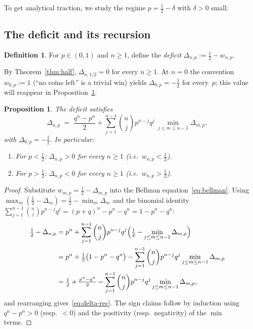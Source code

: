 \documentclass[reqno,final,11pt]{amsart}
\theoremstyle{plain}
\newtheorem{proposition}[theorem]{Proposition}
\theoremstyle{definition}
\newtheorem{definition}[theorem]{Definition}
\theoremstyle{remark}
\begin{document}
To get analytical traction, we study the regime
$p=\tfrac12-\delta$ with $\delta>0$ small.

\subsection{The deficit and its recursion}

\begin{definition}\label{def:deficit}
  For $p\in(0,1)$ and $n\ge 1$, define the
  \emph{deficit}
  $\Delta_{n,p}:=\tfrac12-w_{n,p}$.
\end{definition}

By Theorem~\ref{thm:half}, $\Delta_{n,1/2}=0$ for every $n\ge 1$.
At $n=0$ the convention $w_{0,p}:=1$ (``no coins left'' is a
trivial win) yields $\Delta_{0,p}=-\tfrac12$ for every~$p$; this
value will reappear in Proposition~\ref{prop:delta-rec}.

\begin{proposition}\label{prop:delta-rec}
  The deficit satisfies
  \begin{equation}\label{eq:delta-rec}
    \Delta_{n,p} \;=\;
    \frac{q^n-p^n}{2}
    + \sum_{j=1}^{n-1}\binom{n}{j}p^{n-j}q^{j}\,
    \min_{j\le m\le n-1}\Delta_{m,p},
  \end{equation}
  with $\Delta_{0,p}=-\tfrac12$.
  In particular:
  \begin{enumerate}[\rm(i)]
  \item For $p<\tfrac12$: $\Delta_{n,p}>0$ for every $n\ge 1$
    (i.e.\ $w_{n,p}<\tfrac12$).
  \item For $p>\tfrac12$: $\Delta_{n,p}<0$ for every $n\ge 1$
    (i.e.\ $w_{n,p}>\tfrac12$).
  \end{enumerate}
\end{proposition}

\begin{proof}
  Substitute $w_{m,p}=\tfrac12-\Delta_{m,p}$ into the
  Bellman equation~\eqref{eq:bellman}.  Using
  $\max_m(\tfrac12-\Delta_m) = \tfrac12 - \min_m\Delta_m$ and the
  binomial identity $\sum_{j=1}^{n-1}\binom{n}{j}p^{n-j}q^j
  = (p+q)^n - p^n - q^n = 1 - p^n - q^n$:
  \begin{align*}
    \tfrac12 - \Delta_{n,p}
    &= p^n + \sum_{j=1}^{n-1}\binom{n}{j}p^{n-j}q^j
       \Bigl(\tfrac12 - \min_{j\le m\le n-1}\Delta_{m,p}\Bigr) \\
    &= p^n + \tfrac12\bigl(1 - p^n - q^n\bigr)
       - \sum_{j=1}^{n-1}\binom{n}{j}p^{n-j}q^j\min_{j\le m\le n-1}\Delta_{m,p} \\
    &= \tfrac12 + \tfrac{p^n - q^n}{2}
       - \sum_{j=1}^{n-1}\binom{n}{j}p^{n-j}q^j\min_{j\le m\le n-1}\Delta_{m,p},
  \end{align*}
  and rearranging gives~\eqref{eq:delta-rec}.
  The sign claims follow by induction using $q^n-p^n>0$ (resp.\ $<0$)
  and the positivity (resp.\ negativity) of the $\min$ terms.
\end{proof}
\end{document}
